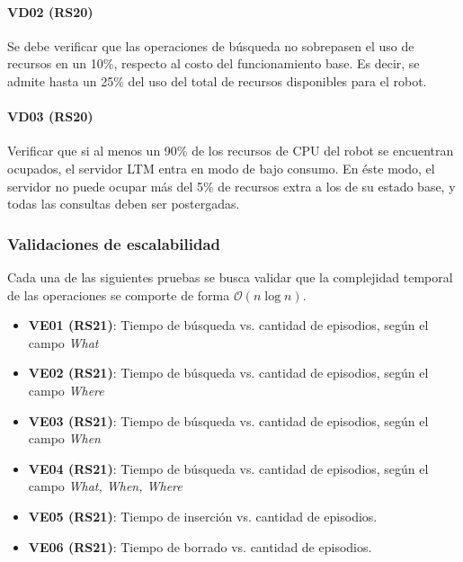 \paragraph{VD02 (RS20)}
Se debe verificar que las operaciones de búsqueda no sobrepasen el uso de recursos en un 10\%, respecto al costo del funcionamiento base. Es decir, se admite hasta un 25\% del uso del total de recursos disponibles para el robot.

\paragraph{VD03 (RS20)}
Verificar que si al menos un 90\% de los recursos de CPU del robot se encuentran ocupados, el servidor LTM entra en modo de bajo consumo. En éste modo, el servidor no puede ocupar más del 5\% de recursos extra a los de su estado base, y todas las consultas deben ser postergadas.


\subsubsection{Validaciones de escalabilidad}

Cada una de las siguientes pruebas se busca validar que la complejidad temporal de las operaciones se comporte de forma $\mathcal{O}(n\log{}n)$.

\begin{itemize}
	\item {\bf VE01 (RS21)}: Tiempo de búsqueda vs. cantidad de episodios, según el campo \textit{What}
	\item {\bf VE02 (RS21)}: Tiempo de búsqueda vs. cantidad de episodios, según el campo \textit{Where}
	\item {\bf VE03 (RS21)}: Tiempo de búsqueda vs. cantidad de episodios, según el campo \textit{When}
	\item {\bf VE04 (RS21)}: Tiempo de búsqueda vs. cantidad de episodios, según el campo \textit{What, When, Where}
	\item {\bf VE05 (RS21)}: Tiempo de inserción vs. cantidad de episodios.
	\item {\bf VE06 (RS21)}: Tiempo de borrado vs. cantidad de episodios.
\end{itemize}


